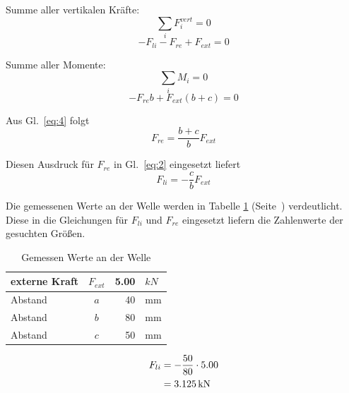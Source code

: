 \documentclass[
a4paper,     %
 headsepline, %
 halfparskip,     %
 fleqn,       %
12pt         %
]{scrartcl}  %
\begin{document}
Summe aller vertikalen Kräfte:
\begin{equation}
  \label{eq:1}
  \sum\limits_{i} F_{i}^{vert} = 0
\end{equation}
\begin{equation}
  \label{eq:2}
  -F_{li} - F_{re} + F_{ext} = 0
\end{equation}

Summe aller Momente:
\begin{equation}
  \label{eq:3}
  \sum\limits_{i} M_{i} = 0
\end{equation}
\begin{equation}
  \label{eq:4}
  -F_{re}b + F_{ext}(b+c) = 0
\end{equation}

Aus Gl.~\eqref{eq:4} folgt
\begin{equation}
  \label{eq:5}
  F_{re} = \frac{b+c}{b} F_{ext} 
\end{equation}

Diesen Ausdruck für $F_{re}$ in Gl.~\eqref{eq:2} eingesetzt liefert
\begin{equation}
  \label{eq:6}
  F_{li} = -\frac{c}{b} F_{ext} 
\end{equation}

Die gemessenen Werte an der Welle werden in Tabelle \ref{tab:wertewelle} (Seite~\pageref{tab:wertewelle}) verdeutlicht. Diese in die Gleichungen für $F_{li}$ und $F_{re}$ eingesetzt liefern die Zahlenwerte der gesuchten Größen.

\begin{table}[bt]
  \centering
  \begin{tabular}{|l|c|r|l|}
\hline
externe Kraft & $F_{ext}$ & 5.00 & $\unit{kN}$ \\
\hline
Abstand       & $a$       & 40    & \unit{mm}   \\
\hline
Abstand       & $b$       & 80    & \unit{mm}   \\
\hline
Abstand       & $c$       & 50    & \unit{mm}   \\
\hline
  \end{tabular}
  \caption{Gemessen Werte an der Welle}
  \label{tab:wertewelle}
\end{table}

\begin{equation}
  \label{eq:9}
  \begin{aligned}
    F_{li} & = -\frac{50}{80}\cdot 5.00 \\
           & = \unit[3.125]{kN}    
  \end{aligned}
\end{equation}
\end{document}
